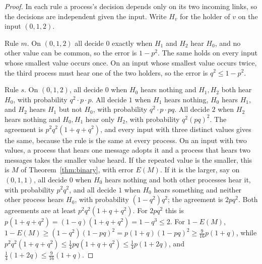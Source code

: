 \documentclass[11pt]{article}
\theoremstyle{remark}
\begin{document}
\begin{proof}
In each rule a process's decision depends only on its two incoming links, so the decisions are independent given the input. Write $H_v$ for the holder of $v$ on the input $(0,1,2)$.

Rule $m$. On $(0,1,2)$ all decide $0$ exactly when $H_1$ and $H_2$ hear $H_0$, and no other value can be common, so the error is $1-p^2$. The same holds on every input whose smallest value occurs once. On an input whose smallest value occurs twice, the third process must hear one of the two holders, so the error is $q^2\le1-p^2$.

Rule $s$. On $(0,1,2)$, all decide $0$ when $H_0$ hears nothing and $H_1,H_2$ both hear $H_0$, with probability $q^2\cdot p\cdot p$. All decide $1$ when $H_1$ hears nothing, $H_0$ hears $H_1$, and $H_2$ hears $H_1$ but not $H_0$, with probability $q^2\cdot p\cdot pq$. All decide $2$ when $H_2$ hears nothing and $H_0,H_1$ hear only $H_2$, with probability $q^2(pq)^2$. The agreement is $p^2q^2(1+q+q^2)$, and every input with three distinct values gives the same, because the rule is the same at every process. On an input with two values, a process that hears one message adopts it and a process that hears two messages takes the smaller value heard. If the repeated value is the smaller, this is $M$ of Theorem~\ref{thm:binary}, with error $E(M)$. If it is the larger, say on $(0,1,1)$, all decide $0$ when $H_0$ hears nothing and both other processes hear it, with probability $p^2q^2$, and all decide $1$ when $H_0$ hears something and neither other process hears $H_0$, with probability $(1-q^2)q^2$; the agreement is $2pq^2$. Both agreements are at least $p^2q^2(1+q+q^2)$. For $2pq^2$ this is $p(1+q+q^2)=(1-q)(1+q+q^2)=1-q^3\le 2$. For $1-E(M)$, $1-E(M)\ge(1-q^2)(1-pq)^2=p(1+q)(1-pq)^2\ge\tfrac9{16}p(1+q)$, while $p^2q^2(1+q+q^2)\le\tfrac14 pq(1+q+q^2)\le\tfrac14p(1+2q)$, and $\tfrac14(1+2q)\le\tfrac9{16}(1+q)$.


\end{proof}
\end{document}
